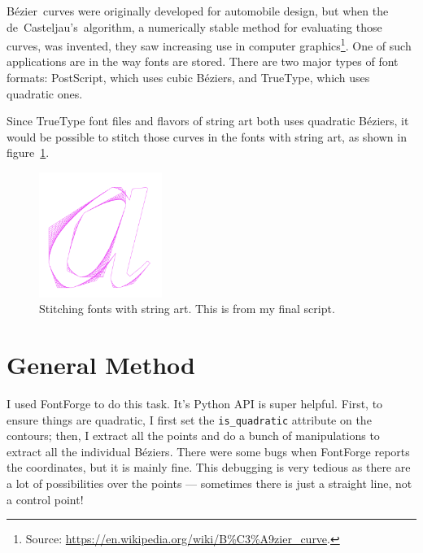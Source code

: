 \documentclass{article}
\newcommand{\bez}{B\'ezier}
\begin{document}
	\bez\ curves were originally developed for automobile design, but when the de~Casteljau's~algorithm, a numerically stable method for evaluating those curves, was invented, they saw increasing use in computer graphics\footnote{Source: \url{https://en.wikipedia.org/wiki/B\%C3\%A9zier_curve}.}. One of such applications are in the way fonts are stored. There are two major types of font formats: PostScript, which uses cubic \bez s, and TrueType, which uses quadratic ones.
	
	Since TrueType font files and flavors of string art both uses quadratic \bez s, it would be possible to stitch those curves in the fonts with string art, as shown in figure~\ref{stitchf}.
	
	\begin{figure}\centering
		\includegraphics[width=4cm]{picture1}
		\caption{Stitching fonts with string art. This is from my final script.\label{stitchf}}
	\end{figure}
	
	\section{General Method}
	I used FontForge to do this task. It's Python API is super helpful. First, to ensure things are quadratic, I first set the \verb|is_quadratic| attribute on the contours; then, I extract all the points and do a bunch of manipulations to extract all the individual \bez s. There were some bugs when FontForge reports the coordinates, but it is mainly fine. This debugging is very tedious as there are a lot of possibilities over the points --- sometimes there is just a straight line, not a control point!
	
\end{document}
